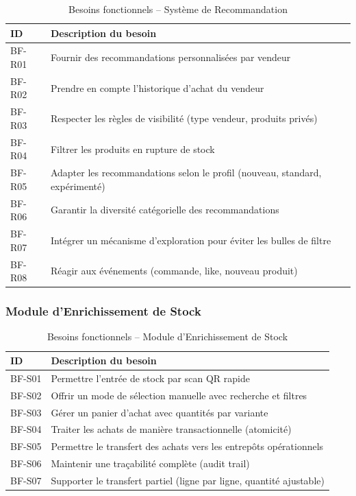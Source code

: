 \documentclass[12pt,a4paper,openany]{report}
\begin{document}
\begin{table}[H]
\centering
{}
\begin{tabularx}{\textwidth}{lX}
\toprule
\rowcolor{headerblue!20}
\textbf{ID} & \textbf{Description du besoin} \\
\midrule
BF-R01 & Fournir des recommandations personnalisées par vendeur \\
BF-R02 & Prendre en compte l'historique d'achat du vendeur \\
BF-R03 & Respecter les règles de visibilité (type vendeur, produits privés) \\
BF-R04 & Filtrer les produits en rupture de stock \\
BF-R05 & Adapter les recommandations selon le profil (nouveau, standard, expérimenté) \\
BF-R06 & Garantir la diversité catégorielle des recommandations \\
BF-R07 & Intégrer un mécanisme d'exploration pour éviter les bulles de filtre \\
BF-R08 & Réagir aux événements (commande, like, nouveau produit) \\
\bottomrule
\end{tabularx}
\caption{Besoins fonctionnels -- Système de Recommandation}
\end{table}

\subsubsection{Module d'Enrichissement de Stock}

\begin{table}[H]
\centering
{}
\begin{tabularx}{\textwidth}{lX}
\toprule
\rowcolor{headerblue!20}
\textbf{ID} & \textbf{Description du besoin} \\
\midrule
BF-S01 & Permettre l'entrée de stock par scan QR rapide \\
BF-S02 & Offrir un mode de sélection manuelle avec recherche et filtres \\
BF-S03 & Gérer un panier d'achat avec quantités par variante \\
BF-S04 & Traiter les achats de manière transactionnelle (atomicité) \\
BF-S05 & Permettre le transfert des achats vers les entrepôts opérationnels \\
BF-S06 & Maintenir une traçabilité complète (audit trail) \\
BF-S07 & Supporter le transfert partiel (ligne par ligne, quantité ajustable) \\
\bottomrule
\end{tabularx}
\caption{Besoins fonctionnels -- Module d'Enrichissement de Stock}
\end{table}
\end{document}
